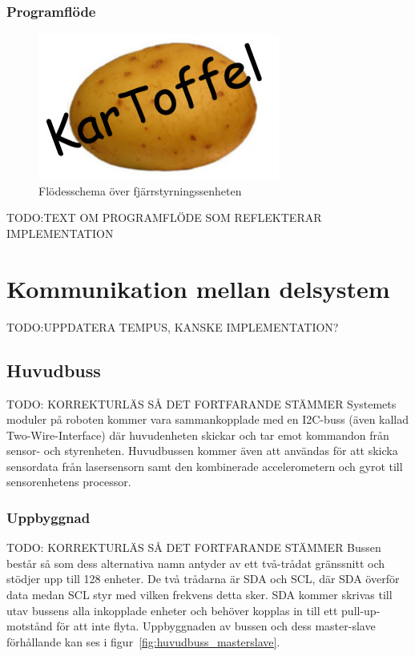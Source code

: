 \documentclass{article}
\begin{document}
\subsubsection{Programflöde}
\begin{figure}[H]
\centering 
\includegraphics[scale=0.3]{Logo}
\caption{Flödesschema över fjärrstyrningssenheten}
\label{fig:Fjarrstyrningsenhet_flowchart3}
\end{figure}

TODO:TEXT OM PROGRAMFLÖDE SOM REFLEKTERAR IMPLEMENTATION

\section{Kommunikation mellan delsystem}
\label{sec:kommunikation_mellan_delsystem}
TODO:UPPDATERA TEMPUS, KANSKE IMPLEMENTATION?

\subsection{Huvudbuss}
TODO: KORREKTURLÄS SÅ DET FORTFARANDE STÄMMER 
Systemets moduler på roboten kommer vara sammankopplade med en I2C-buss (även kallad Two-Wire-Interface) där huvudenheten skickar och tar emot kommandon från sensor- och styrenheten. Huvudbussen kommer även att användas för att skicka sensordata från lasersensorn samt den kombinerade accelerometern och gyrot till sensorenhetens processor.

\subsubsection{Uppbyggnad}
TODO: KORREKTURLÄS SÅ DET FORTFARANDE STÄMMER 
Bussen består så som dess alternativa namn antyder av ett två-trådat gränssnitt och stödjer upp till 128 enheter. De två trådarna är SDA och SCL, där SDA överför data medan SCL styr med vilken frekvens detta sker. SDA kommer skrivas till utav bussens alla inkopplade enheter och behöver kopplas in till ett pull-up-motstånd för att inte flyta. Uppbyggnaden av bussen och dess master-slave förhållande kan ses i figur~\ref{fig:huvudbuss_masterslave}.
\end{document}
